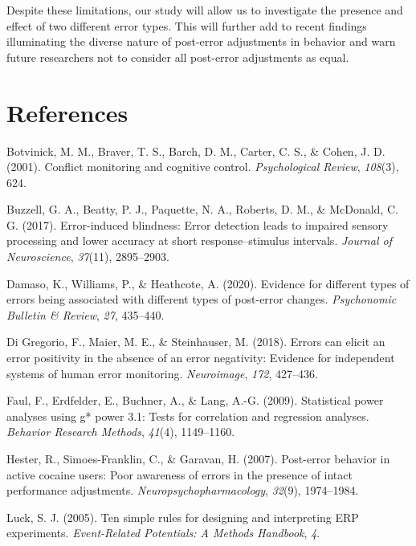 \documentclass[
  man,floatsintext]{apa7}
\newlength{\cslhangindent}
\newlength{\cslentryspacingunit} %
\newenvironment{CSLReferences}[2] %
 {%
  \setlength{\parindent}{0pt}
  \ifodd #1
  \let\oldpar\par
  \def\par{\hangindent=\cslhangindent\oldpar}
  \fi
  \setlength{\parskip}{#2\cslentryspacingunit}
 }%
 {}
\begin{document}
Despite these limitations, our study will allow us to investigate the presence and effect of two different error types. This will further add to recent findings illuminating the diverse nature of post-error adjustments in behavior and warn future researchers not to consider all post-error adjustments as equal.

\newpage

\hypertarget{references}{%
\section{References}\label{references}}

\hypertarget{refs}{}
\begin{CSLReferences}{1}{0}
\leavevmode{}%
Botvinick, M. M., Braver, T. S., Barch, D. M., Carter, C. S., \& Cohen, J. D. (2001). Conflict monitoring and cognitive control. \emph{Psychological Review}, \emph{108}(3), 624.

\leavevmode{}%
Buzzell, G. A., Beatty, P. J., Paquette, N. A., Roberts, D. M., \& McDonald, C. G. (2017). Error-induced blindness: Error detection leads to impaired sensory processing and lower accuracy at short response--stimulus intervals. \emph{Journal of Neuroscience}, \emph{37}(11), 2895--2903.

\leavevmode{}%
Damaso, K., Williams, P., \& Heathcote, A. (2020). Evidence for different types of errors being associated with different types of post-error changes. \emph{Psychonomic Bulletin \& Review}, \emph{27}, 435--440.

\leavevmode{}%
Di Gregorio, F., Maier, M. E., \& Steinhauser, M. (2018). Errors can elicit an error positivity in the absence of an error negativity: Evidence for independent systems of human error monitoring. \emph{Neuroimage}, \emph{172}, 427--436.

\leavevmode{}%
Faul, F., Erdfelder, E., Buchner, A., \& Lang, A.-G. (2009). Statistical power analyses using g* power 3.1: Tests for correlation and regression analyses. \emph{Behavior Research Methods}, \emph{41}(4), 1149--1160.

\leavevmode{}%
Hester, R., Simoes-Franklin, C., \& Garavan, H. (2007). Post-error behavior in active cocaine users: Poor awareness of errors in the presence of intact performance adjustments. \emph{Neuropsychopharmacology}, \emph{32}(9), 1974--1984.

\leavevmode{}%
Luck, S. J. (2005). Ten simple rules for designing and interpreting ERP experiments. \emph{Event-Related Potentials: A Methods Handbook}, \emph{4}.

\end{CSLReferences}
\end{document}
